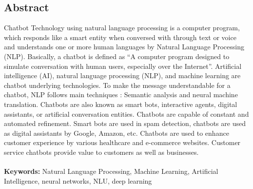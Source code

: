 \documentclass[12pt,a4paper]{report}     %
\begin{document}
		\newpage					%
		\pagestyle{plain}           %
		\begin{center}				%
			\begin{LARGE}
						\section*{ Abstract}
			\end{LARGE}
		\end{center}
		\begin{normalsize}
{\setlength{\baselineskip}{1.1\baselineskip}   %
\noindent %
Chatbot Technology using natural language processing is a computer program, which responds like a smart entity when conversed with through text or voice and understands one or more human languages by Natural Language Processing (NLP). Basically, a chatbot is defined as “A computer program designed to simulate conversation with human users, especially over the Internet”. Artificial intelligence (AI), natural language processing (NLP), and machine learning are chatbot underlying technologies. To make the message understandable for a chatbot, NLP follows main techniques : Semantic analysis and neural machine translation. Chatbots are also known as smart bots, interactive agents, digital assistants, or artificial conversation entities. Chatbots are capable of constant and automated refinement. Smart bots are used in spam detection, chatbots are used as digital assistants by Google, Amazon, etc. Chatbots are used to enhance customer experience by various healthcare and e-commerce websites. Customer service chatbots provide value to customers as well as businesses. \\\\ 
\textbf{Keywords:} %
Natural Language Processing, Machine Learning, Artificial Intelligence,
neural networks, NLU, deep learning\\\\
\par}
		\end{normalsize}
\newpage
\end{document}
